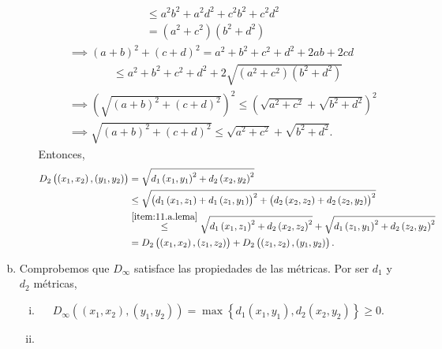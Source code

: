 \begin{eje}
\begin{enumerate}[(a)]
\begin{enumerate}[i)]
\begin{align}
                    &\qquad\qquad\qquad\quad \leq a^2b^2+a^2d^2+c^2b^2+c^2d^2 \\ \nonumber
                    &\qquad\qquad\qquad\quad = \left( a^2+c^2 \right) \left( b^2+d^2 \right) \\ \nonumber
                &\implies \left( a+b \right) ^2 + \left( c+d\right) ^2 = a^2+b^2+c^2+d^2 +2ab +2cd \\ \nonumber
                &\qquad \qquad \leq a^2+b^2+c^2+d^2+2\sqrt{\left( a^2+c^2\right) \left( b^2+d^2\right)} \\ \nonumber
                &\implies\left( \sqrt{\left( a+b \right) ^2 + \left( c+d \right) ^2} \right) ^2 \leq \left( \sqrt{a^2+c^2} + \sqrt{b^2+d^2} \right) ^2 \\
                \label{item:11.a.lema} &\implies \sqrt{\left( a+b \right) ^2 + \left( c+d \right) ^2} \leq \sqrt{a^2+c^2} + \sqrt{b^2+d^2}.
            \end{align}
            Entonces,
            \begin{align*}
                D_2 \left( \left( x_1, x_2 \right) , \left( y_1 , y_2 \right) \right) &= \sqrt{ d_1 \left( x_1, y_1\right) ^2 + d_2 \left( x_2 , y_2 \right)^2 } \\
                &\leq \sqrt{ \left( d_1 \left( x_1, z_1\right) + d_1\left( z_1, y_1 \right) \right) ^2 + \left( d_2 \left( x_2, z_2 \right) + d_2\left( z_2, y_2 \right) \right) ^2 }\\
                & \stackrel{\eqref{item:11.a.lema}}{\leq} \sqrt{d_1\left( x_1, z_1 \right) ^2+d_2 \left( x_2, z_2 \right) ^2} + \sqrt{d_1\left( z_1, y_1 \right) ^2+d_2 \left( z_2, y_2 \right) ^2}\\
                &= D_2 \left( \left( x_1, x_2 \right) , \left( z_1 , z_2 \right) \right) + D_2 \left( \left( z_1, z_2 \right) , \left( y_1 , y_2 \right) \right).
            \end{align*}            
        \end{enumerate}
        \item Comprobemos que $D_{\infty}$ satisface las propiedades de las métricas. Por ser $d_1$ y $d_2$ métricas,
        \begin{enumerate}[i)]
            \item
            \[
                D_{\infty} \left( \left( x_1, x_2 \right) , \left( y_1 , y_2 \right) \right) = \max \left\{ d_1 \left( x_1, y_1\right) , d_2 \left( x_2 , y_2 \right) \right\} \geq 0.
            \]
            \item 

\end{enumerate}
\end{enumerate}
\end{eje}
